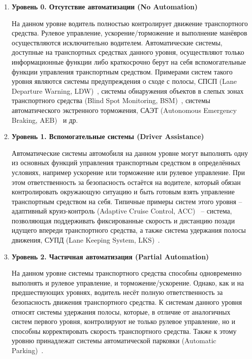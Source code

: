 \begin{enumerate}
	\item \textbf{Уровень 0. Отсутствие автоматизации (No Automation)}
	
	
	На данном уровне водитель полностью контролирует движение транспортного средства. Рулевое управление, ускорение/торможение и выполнение манёвров осуществляются исключительно водителем. Автоматические системы, доступные на транспортных средствах данного уровня, осуществляют только информационные функции либо краткосрочно берут на себя вспомогательные функции управления транспортным средством. Примерами систем такого уровня являются системы предупреждения о сходе с полосы, СПСП (Lane Departure Warning, LDW)~\cite{chen2020lane}, системы обнаружения объектов в слепых зонах транспортного средства (Blind Spot Monitoring, BSM)~\cite{forkenbrock2014blind}, системы автоматического экстренного торможения, САЭТ (Autonomous Emergency Braking, AEB)~\cite{hulshof2013autonomous} и др.
	
	\item \textbf{Уровень 1. Вспомогательные системы (Driver Assistance)}
	
	Автоматические системы автомобиля на данном уровне могут выполнять одну из основных функций управления транспортным средством в определённых условиях, например ускорение или торможение или рулевое управление. При этом ответственность за безопасность остаётся на водителе, который обязан контролировать окружающую ситуацию и быть готовым взять управление транспортным средством на себя. Типичные примеры систем этого уровня -- адаптивный круиз-контроль (Adaptive Cruise Control, ACC)~\cite{pananurak2009adaptive} -- система, позволяющая поддерживать фиксированные скорость и дистанцию позади идущего впереди транспортного средства, а также система удержания полосы движения, СУПД (Lane Keeping System, LKS)~\cite{amditis2010situation}.
	
	\item \textbf{Уровень 2. Частичная автоматизация (Partial Automation)}
	
	На данном уровне системы транспортного средства способны одновременно выполнять и рулевое управление, и торможение/ускорение. Однако, как и на предшествующих уровнях, водитель несёт полную ответственность за безопасность движения транспортного средства. К системам данного уровня относят системы удержания полосы, которые, в отличие от аналогичных систем первого уровня, контролируют не только рулевое управление, но и способны корректировать скорость транспортного средства. Также к этому уровню принадлежат системы автоматической парковки (Automatic Parking)~\cite{ma2017research}.
	

\end{enumerate}
